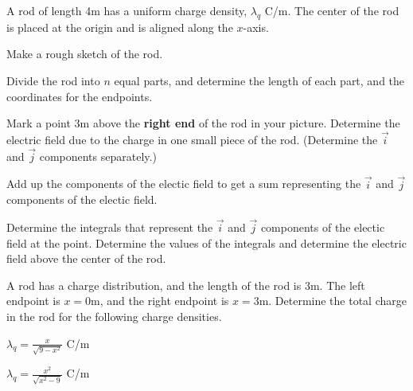 \begin{problem}
  \item  A rod of length 4m has a uniform charge density, $\lambda_q$ C/m.
  The center of the rod is placed at the origin and is aligned along the
  $x$-axis.
  \begin{subproblem}
    \item Make a rough sketch of the rod.
         \vspace{5em}
   \item Divide the rod into $n$ equal parts, and determine the length of
         each part, and the coordinates for the endpoints.
         \vspace{2em}
     \item Mark a point 3m above the \textbf{right end} of the rod in your picture. Determine the
         electric field due to the charge in one small piece of the rod.
         (Determine the $\vec{i}$ and $\vec{j}$ components separately.)
       \vfill
     \item Add up the components of the electic field to get a sum representing the
      $\vec{i}$ and $\vec{j}$ components of the electic field.
      \vfill
    \clearpage
    \item Determine the integrals that represent the $\vec{i}$ and $\vec{j}$ components of the electic field at the point.
      Determine the values of the integrals and determine the electric field above the center of the rod.
      \vfill
  \end{subproblem}

\clearpage

\item A rod has a charge distribution, and the length of the rod is
  3m. The left endpoint is $x=0$m, and the right endpoint is
  $x=3$m. Determine the total charge in the rod for the following
  charge densities.
  \begin{subproblem}
    \item $\lambda_q = \frac{x}{\sqrt{9-x^2}}$ C/m
      \vfill
    \item $\lambda_q = \frac{x^2}{\sqrt{x^2-9}}$ C/m
      \vfill
  \end{subproblem}
\end{problem}

\postClass

